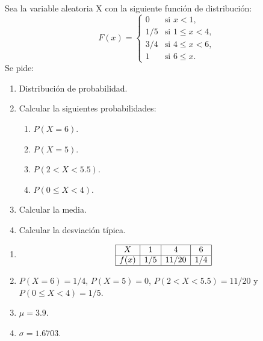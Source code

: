 {Sea la variable aleatoria X con la siguiente función de distribución:
\[
F(x)=
\begin{cases}
0 & \text{si $x<1$,} \\
1/5 & \text{si $1\leq x< 4$,} \\
3/4 & \text{si $4\leq x<6$,} \\
1 & \text{si $6\leq x$.}
\end{cases}
\]
Se pide:
\begin{enumerate}
\item Distribución de probabilidad.
\item Calcular la siguientes probabilidades:
\begin{enumerate}
\item $P(X=6)$.
\item $P(X=5)$.
\item $P(2<X<5.5)$.
\item $P(0\leq X<4)$.
\end{enumerate}
\item Calcular la media.
\item Calcular la desviación típica. 
\end{enumerate}
}
{
\begin{enumerate}
\item \[
\begin{array}{|c|c|c|c|}
\hline
X & 1 & 4 & 6 \\
\hline
f(x) & 1/5 & 11/20 & 1/4\\
\hline
\end{array}
\]
\item $P(X=6)=1/4$, $P(X=5)=0$, $P(2<X<5.5)=11/20$ y $P(0\leq X<4)=1/5$.
\item $\mu=3.9$.
\item $\sigma=1.6703$.
\end{enumerate}
}
{}



